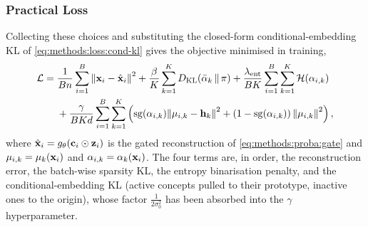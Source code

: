 \subsubsection{Practical Loss}
Collecting these choices and substituting the closed-form conditional-embedding
\ac{KL} of \cref{eq:methods:loss:cond-kl} gives
the objective minimised in training,
\begin{equation} \label{eq:methods:loss:objective}
    \begin{split}
        \mathcal{L} =
        {}& \frac{1}{Bn} \sum_{i=1}^{B} \norm{\vb{x}_{i} - \hat{\vb{x}}_{i}}^{2}
        + \frac{\beta}{K} \sum_{k=1}^{K} D_{\mathrm{KL}}\!\left(\bar{\alpha}_{k} \,\middle\|\, \pi\right)
        + \frac{\lambda_{\mathrm{ent}}}{BK} \sum_{i=1}^{B} \sum_{k=1}^{K} \mathcal{H}(\alpha_{i,k})\\
        &+ \frac{\gamma}{BKd} \sum_{i=1}^{B} \sum_{k=1}^{K} \left(\operatorname{sg}(\alpha_{i,k}) \norm{\vb{\mu}_{i,k} - \vb{h}_{k}}^{2}
            + \left(1 - \operatorname{sg}(\alpha_{i,k})\right)\norm{\vb{\mu}_{i,k}}^{2}\right),
    \end{split}
\end{equation}
where $\hat{\vb{x}}_i = g_\theta(\vb{c}_i \odot \vb{z}_i)$ is the gated
reconstruction of \cref{eq:methods:proba:gate} and
$\vb{\mu}_{i,k} = \vb{\mu}_k(\vb{x}_i)$ and $\alpha_{i,k} = \alpha_k(\vb{x}_i)$.
The four terms are, in order, the
reconstruction error, the batch-wise sparsity \ac{KL}, the entropy binarisation
penalty, and the conditional-embedding \ac{KL} (active concepts pulled to their
prototype, inactive ones to the origin), whose factor $\tfrac{1}{2\sigma_0^2}$
has been absorbed into the $\gamma$ hyperparameter.

